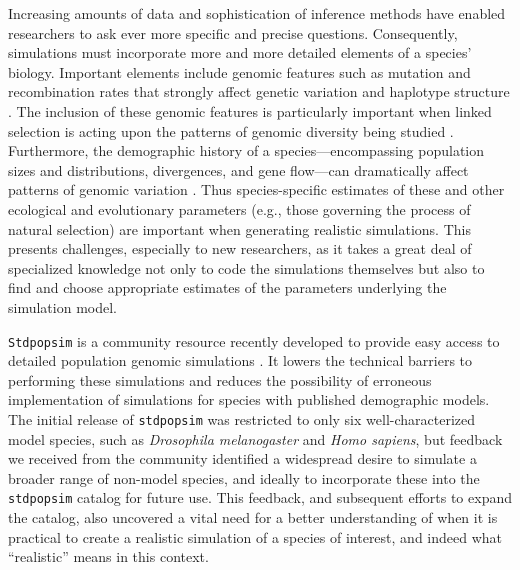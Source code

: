 \documentclass[hidelinks]{article}
\newcommand{\Stdpopsim}{\texttt{Stdpopsim}\xspace}
\newcommand{\stdpopsim}{\texttt{stdpopsim}\xspace}
\begin{document}
Increasing amounts of data and sophistication of inference methods
have enabled researchers to ask ever more
specific and precise questions. Consequently, simulations must incorporate
more and more detailed elements of a species' biology.
Important elements include genomic features such as mutation and recombination
rates that strongly affect genetic variation and haplotype structure
\citep{Nachman2002}. The inclusion of these genomic features is particularly important
when linked selection is acting upon the patterns of genomic diversity being studied \citep{Cutter2013}.
Furthermore, the demographic history of a species---encompassing population sizes and distributions, divergences, and gene flow---can
dramatically affect patterns of genomic variation \citep{Teshima2006}. Thus
species-specific estimates of these and other ecological and evolutionary parameters 
(e.g., those governing the process of natural selection) 
are important when generating realistic simulations.
This presents challenges, especially to new researchers,
as it takes a great deal of specialized knowledge not only to code the simulations themselves
but also to find and choose appropriate estimates of the parameters underlying the simulation model.

\Stdpopsim is a community resource recently developed to provide easy
access to detailed population genomic simulations \citep{Adrion2020}. It
lowers the technical barriers to performing these simulations
and reduces the possibility of erroneous implementation of simulations
for species with published demographic models. 
The initial release of \stdpopsim was
restricted to only six well-characterized model species, such as
\emph{Drosophila melanogaster} and \emph{Homo sapiens},
but feedback we received from the community identified a widespread desire
to simulate a broader range of non-model species,
and ideally to incorporate these into the \stdpopsim catalog for future use.
This feedback, and subsequent efforts to expand the catalog, 
also uncovered a vital need for a better understanding of when it is practical to create a realistic
simulation of a species of interest, and indeed what ``realistic'' means in this context.
\end{document}
